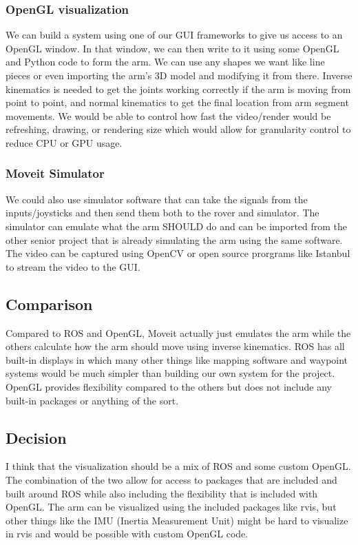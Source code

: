 \documentclass[onecolumn, draftclsnofoot, 10pt, compsoc]{IEEEtran}
\begin{document}
\subsubsection{OpenGL visualization}
We can build a system using one of our GUI frameworks to give us access to an OpenGL window.
In that window, we can then write to it using some OpenGL and Python code to form the arm. 
We can use any shapes we want like line pieces or even importing the arm's 3D model and modifying it from there. 
Inverse kinematics is needed to get the joints working correctly if the arm is moving from point to point, and normal kinematics to get the final location from arm segment movements.
We would be able to control how fast the video/render would be refreshing, drawing, or rendering size which would allow for granularity control to reduce CPU or GPU usage.

\subsubsection{Moveit Simulator}
We could also use simulator software that can take the signals from the inputs/joysticks and then send them both to the rover and simulator.
The simulator can emulate what the arm SHOULD do and can be imported from the other senior project that is already simulating the arm using the same software.
The video can be captured using OpenCV or open source prorgrams like Istanbul to stream the video to the GUI.

\subsection{Comparison}
Compared to ROS and OpenGL, Moveit actually just emulates the arm while the others calculate how the arm should move using inverse kinematics.
ROS has all built-in displays in which many other things like mapping software and waypoint systems would be much simpler than building our own system for the project.
OpenGL provides flexibility compared to the others but does not include any built-in packages or anything of the sort.

\subsection{Decision}
I think that the visualization should be a mix of ROS and some custom OpenGL.
The combination of the two allow for access to packages that are included and built around ROS while also including the flexibility that is included with OpenGL. 
The arm can be visualized using the included packages like rvis, but other things like the IMU (Inertia Measurement Unit) might be hard to visualize in rvis and would be possible with custom OpenGL code.
\end{document}
